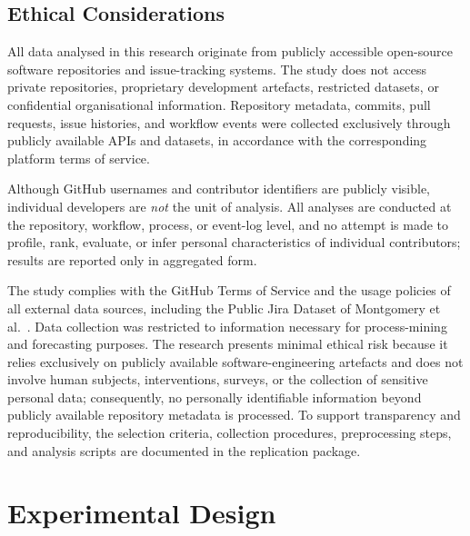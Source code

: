 \subsection{Ethical Considerations}
\label{sec:ethics}

All data analysed in this research originate from publicly accessible
open-source software repositories and issue-tracking systems. The study does
not access private repositories, proprietary development artefacts, restricted
datasets, or confidential organisational information. Repository metadata,
commits, pull requests, issue histories, and workflow events were collected
exclusively through publicly available APIs and datasets, in accordance with
the corresponding platform terms of service.

Although GitHub usernames and contributor identifiers are publicly visible,
individual developers are \emph{not} the unit of analysis. All analyses are
conducted at the repository, workflow, process, or event-log level, and no
attempt is made to profile, rank, evaluate, or infer personal characteristics
of individual contributors; results are reported only in aggregated form.

The study complies with the GitHub Terms of Service and the usage policies of
all external data sources, including the Public Jira Dataset of Montgomery et
al.~\cite{montgomery2022jira}. Data collection was restricted to information
necessary for process-mining and forecasting purposes. The research presents
minimal ethical risk because it relies exclusively on publicly available
software-engineering artefacts and does not involve human subjects,
interventions, surveys, or the collection of sensitive personal data;
consequently, no personally identifiable information beyond publicly available
repository metadata is processed. To support transparency and reproducibility,
the selection criteria, collection procedures, preprocessing steps, and
analysis scripts are documented in the replication package.


\section{Experimental Design}
\label{sec:eval-design}

